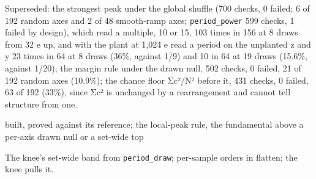 \begin{description}
Superseded: the strongest peak under the global shuffle (700 checks, 0 failed; 6 of 192 random axes and 2 of 48 smooth-ramp axes; \texttt{period\_\allowbreak{}power} 599 checks, 1 failed by design), which read a multiple, 10 or 15, 103 times in 156 at 8 draws from 32 e up, and with the plant at 1,024 e read a period on the unplanted z and y 23 times in 64 at 8 draws (36\%, against 1/9) and 10 in 64 at 19 draws (15.6\%, against 1/20); the margin rule under the drawn null, 502 checks, 0 failed, 21 of 192 random axes (10.9\%); the chance floor Σc²/N² before it, 431 checks, 0 failed, 63 of 192 (33\%), since Σc² is unchanged by a rearrangement and cannot tell structure from one.
\item[{status}] built, proved against its reference; the local-peak rule, the fundamental above a per-axis drawn null or a set-wide top
\item[{next}] The knee's set-wide band from \texttt{period\_\allowbreak{}draw}; per-sample orders in flatten; the knee pulls it.
\end{description}

